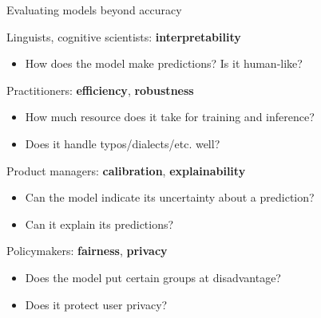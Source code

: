 \documentclass[usenames,dvipsnames,notes,11pt,aspectratio=169,hyperref={colorlinks=true, linkcolor=blue}]{beamer}
\begin{document}
\begin{frame}
    {Evaluating models beyond accuracy}

    Linguists, cognitive scientists: \textbf{interpretability}\\
    \begin{itemize}
        \item How does the model make predictions? Is it human-like?
    \end{itemize}
    \pause

    Practitioners: \textbf{efficiency}, \textbf{robustness}\\
    \begin{itemize}
        \item How much resource does it take for training and inference?
        \item Does it handle typos/dialects/etc. well?
    \end{itemize}
    \pause

    Product managers: \textbf{calibration}, \textbf{explainability}\\
    \begin{itemize}
        \item Can the model indicate its uncertainty about a prediction? 
        \item Can it explain its predictions?
    \end{itemize}
    \pause

    Policymakers: \textbf{fairness}, \textbf{privacy}\\
    \begin{itemize}
        \item Does the model put certain groups at disadvantage?
        \item Does it protect user privacy?
    \end{itemize}
\end{frame}

\end{document}
